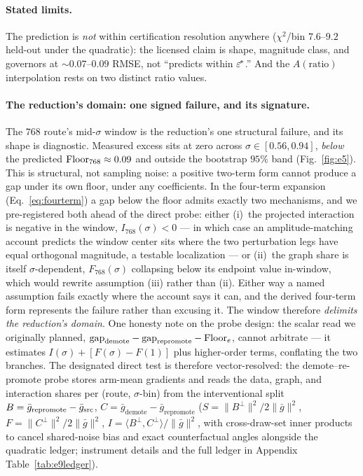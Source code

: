 \paragraph{Stated limits.}
The prediction is \emph{not} within certification resolution anywhere
($\chi^2$/bin $7.6$--$9.2$ held-out under the quadratic): the licensed
claim is shape, magnitude class, and governors at ${\sim}0.07$--$0.09$
RMSE, not ``predicts within $\varepsilon^{\!*}$.'' And the
$A(\mathrm{ratio})$ interpolation rests on two distinct ratio values.

\paragraph{The reduction's domain: one signed failure, and its
signature.}
The $768$ route's mid-$\sigma$ window is the reduction's one structural
failure, and its shape is diagnostic. Measured excess sits at zero
across $\sigma \in [0.56, 0.94]$, \emph{below} the predicted
$\mathrm{Floor}_{768} \approx 0.09$ and outside the bootstrap $95\%$ band
(Fig.~\ref{fig:e5}). This is structural, not sampling noise: a positive
two-term form cannot produce a gap under its own floor, under any
coefficients. In the four-term
expansion (Eq.~\ref{eq:fourterm}) a gap below the floor admits exactly
two mechanisms, and we pre-registered both ahead of the direct probe:
either (i)~the projected interaction is negative in the window,
$I_{768}(\sigma) < 0$ --- in which case an amplitude-matching account
predicts the window center sits where the two perturbation legs have
equal orthogonal magnitude, a testable localization --- or (ii)~the
graph share is itself $\sigma$-dependent, $F_{768}(\sigma)$ collapsing
below its endpoint value in-window, which would rewrite assumption
(iii) rather than (ii). Either way a named assumption fails exactly
where the account says it can, and the derived four-term form
represents the failure rather than excusing it. The window therefore
\emph{delimits the reduction's domain}. One honesty note on the probe
design: the scalar read we originally planned,
$\mathrm{gap}_{\mathrm{demote}} - \mathrm{gap}_{\mathrm{repromote}} - \mathrm{Floor}_e$,
cannot arbitrate --- it estimates $I(\sigma) + [F(\sigma) - F(1)]$
plus higher-order terms, conflating the two branches. The designated
direct test is therefore vector-resolved: the demote--re-promote
probe stores arm-mean gradients and reads the data, graph, and
interaction shares per (route, $\sigma$-bin) from the interventional
split $B = \bar g_{\mathrm{repromote}} - \bar g_{\mathrm{src}}$,
$C = \bar g_{\mathrm{demote}} - \bar g_{\mathrm{repromote}}$
($S = \|B^{\perp}\|^2/2\|\bar g\|^2$,
$F = \|C^{\perp}\|^2/2\|\bar g\|^2$,
$I = \langle B^{\perp}, C^{\perp}\rangle/\|\bar g\|^2$, with
cross-draw-set inner products to cancel shared-noise bias and exact
counterfactual angles alongside the quadratic ledger; instrument
details and the full ledger in Appendix Table~\ref{tab:e9ledger}).

